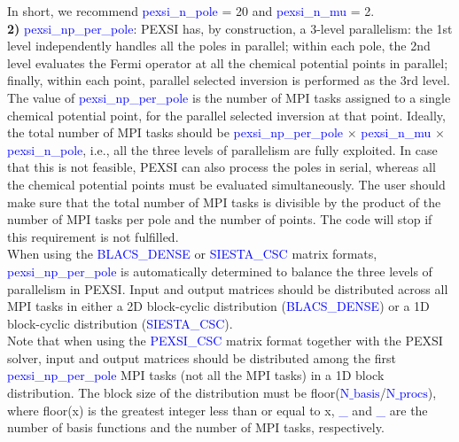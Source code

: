 \documentclass{report}
\begin{document}
In short, we recommend \textcolor{blue}{pexsi\_n\_pole} = 20 and \textcolor{blue}{pexsi\_n\_mu} = 2.\\

\textbf{2)} \textcolor{blue}{pexsi\_np\_per\_pole}:  PEXSI has, by construction, a 3-level parallelism:  the 1st level independently handles all the poles in parallel; within each pole, the 2nd level evaluates the Fermi operator at all the chemical potential points in parallel; finally, within each point, parallel selected inversion is performed as the 3rd level.  The value of \textcolor{blue}{pexsi\_np\_per\_pole} is the number of MPI tasks assigned to a single chemical potential point, for the parallel selected inversion at that point.  Ideally, the total number of MPI tasks should be \textcolor{blue}{pexsi\_np\_per\_pole} $\times$ \textcolor{blue}{pexsi\_n\_mu} $\times$ \textcolor{blue}{pexsi\_n\_pole}, i.e., all the three levels of parallelism are fully exploited.  In case that this is not feasible, PEXSI can also process the poles in serial, whereas all the chemical potential points must be evaluated simultaneously.  The user should make sure that the total number of MPI tasks is divisible by the product of the number of MPI tasks per pole and the number of points.  The code will stop if this requirement is not fulfilled.\\

When using the \textcolor{blue}{BLACS\_DENSE} or \textcolor{blue}{SIESTA\_CSC} matrix formats, \textcolor{blue}{pexsi\_np\_per\_pole} is automatically determined to balance the three levels of parallelism in PEXSI.  Input and output matrices should be distributed across all MPI tasks in either a 2D block-cyclic distribution (\textcolor{blue}{BLACS\_DENSE}) or a 1D block-cyclic distribution (\textcolor{blue}{SIESTA\_CSC}).\\

Note that when using the \textcolor{blue}{PEXSI\_CSC} matrix format together with the PEXSI solver, input and output matrices should be distributed among the first \textcolor{blue}{pexsi\_np\_per\_pole} MPI tasks (not all the MPI tasks) in a 1D block distribution.  The block size of the distribution must be floor(\textcolor{blue}{$\text{N}\_\text{basis}$}/\textcolor{blue}{$\text{N}\_\text{procs}$}), where floor(x) is the greatest integer less than or equal to x, \textcolor{blue}{\_} and \textcolor{blue}{\_} are the number of basis functions and the number of MPI tasks, respectively.\\
\end{document}
